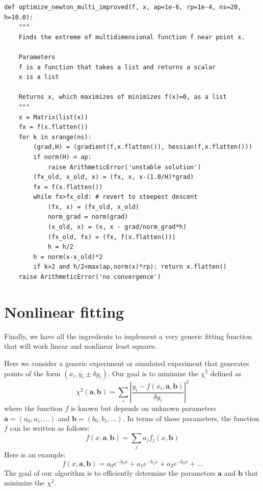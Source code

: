 \documentclass[justified,sixbynine]{tufte-book}
\def\ft{\small\tt}
\theoremstyle{plain}%
\theoremstyle{definition}
\theoremstyle{remark}
\begin{document}
\begin{fullwidth}
\begin{lstlisting}[caption={in file: {\ft nlib.py}}]
def optimize_newton_multi_improved(f, x, ap=1e-6, rp=1e-4, ns=20, h=10.0):
    """
    Finds the extreme of multidimensional function f near point x.

    Parameters
    f is a function that takes a list and returns a scalar
    x is a list

    Returns x, which maximizes of minimizes f(x)=0, as a list
    """
    x = Matrix(list(x))
    fx = f(x.flatten())
    for k in xrange(ns):
        (grad,H) = (gradient(f,x.flatten()), hessian(f,x.flatten()))
        if norm(H) < ap:
            raise ArithmeticError('unstable solution')
        (fx_old, x_old, x) = (fx, x, x-(1.0/H)*grad)
        fx = f(x.flatten())
        while fx>fx_old: # revert to steepest descent
            (fx, x) = (fx_old, x_old)
            norm_grad = norm(grad)
            (x_old, x) = (x, x - grad/norm_grad*h)
            (fx_old, fx) = (fx, f(x.flatten()))
            h = h/2
        h = norm(x-x_old)*2
        if k>2 and h/2<max(ap,norm(x)*rp): return x.flatten()
    raise ArithmeticError('no convergence')
\end{lstlisting}

\goodbreak\section{Nonlinear fitting}

Finally, we have all the ingredients to implement a very generic fitting function that will work linear and nonlinear least squares.

Here we consider a generic experiment or simulated experiment that generates points of the form $(x_i,y_i \pm \delta y_i)$. Our goal is to minimize the $\chi^2$ defined as
\begin{equation}
\chi^2(\mathbf{a},\mathbf{b}) = \sum _i \left|
\frac{y_i - f(x_i,\mathbf{a},\mathbf{b})}{\delta y_i}
\right|^2
\end{equation}
where the function $f$ is known but depends on unknown parameters $\mathbf{a}=(a_0,a_1,\dots)$ and $\mathbf{b}=(b_0,b_1,\dots)$. In terms of these parameters, the function $f$ can be written as follows:
\begin{equation}
f(x,\mathbf{a},\mathbf{b}) = \sum_j a_j f_j(x, \mathbf{b})
\end{equation}
Here is an example:
\begin{equation}
f(x,\mathbf{a},\mathbf{b}) = a_0 e^{-b_0 x} + a_1 e^{-b_1 x} + a_2 e^{-b_2 x} +\dots 
\end{equation}
The goal of our algorithm is to efficiently determine the parameters $\mathbf{a}$ and $\mathbf{b}$ that minimize the $\chi^2$.


\end{fullwidth}
\end{document}
